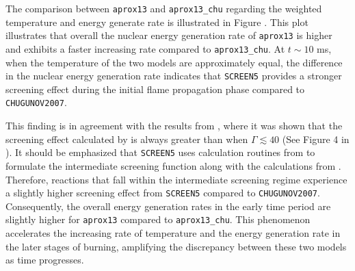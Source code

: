 \documentclass[preprint,times,tighten,linenumbers,trackchanges]{aastex631}
\begin{document}


The comparison between {\tt aprox13} and {\tt aprox13\_chu} regarding the weighted temperature and energy generate rate is illustrated in Figure . This plot illustrates that overall the nuclear energy generation rate of {\tt aprox13} is higher and exhibits a faster increasing rate compared to {\tt aprox13\_chu}. At $t \sim 10$ ms, when the temperature of the two models are approximately equal, the difference in the nuclear energy generation rate indicates that {\tt SCREEN5} provides a stronger screening effect during the initial flame propagation phase compared to {\tt CHUGUNOV2007}.



This finding is in agreement with the results from \cite{Chugunov_2007}, where it was shown that the screening effect calculated by \cite{Alastuey_Jancovici:1978} is always greater than \cite{Chugunov_2007} when $\Gamma \lesssim 40$ (See Figure 4 in \cite{Chugunov_2007}). 
It should be emphasized that {\tt SCREEN5} uses calculation routines from \cite{Alastuey_Jancovici:1978} to formulate the intermediate screening function along with the calculations from \cite{Graboske_1973}. Therefore, reactions that fall within the intermediate screening regime experience a slightly higher screening effect from {\tt SCREEN5} compared to {\tt CHUGUNOV2007}. Consequently, the overall energy generation rates in the early time period are slightly higher for {\tt aprox13} compared to {\tt aprox13\_chu}. This phenomenon accelerates the increasing rate of temperature and the energy generation rate in the later stages of burning, amplifying the discrepancy between these two models as time progresses.
\end{document}
